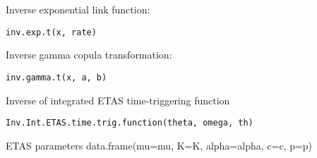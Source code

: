 \documentclass[letterpaper]{book}
\begin{document}
%
\begin{Description}\relax
Inverse exponential link function:
\end{Description}
%
\begin{Usage}
\begin{verbatim}
inv.exp.t(x, rate)
\end{verbatim}
\end{Usage}
%
\begin{Arguments}
\begin{ldescription}
\item[\code{rate}] 
\end{ldescription}
\end{Arguments}
%
\begin{Description}\relax
Inverse gamma copula transformation:
\end{Description}
%
\begin{Usage}
\begin{verbatim}
inv.gamma.t(x, a, b)
\end{verbatim}
\end{Usage}
%
\begin{Arguments}
\begin{ldescription}
\item[\code{b}] 
\end{ldescription}
\end{Arguments}
%
\begin{Description}\relax
Inverse of integrated ETAS time-triggering function
\end{Description}
%
\begin{Usage}
\begin{verbatim}
Inv.Int.ETAS.time.trig.function(theta, omega, th)
\end{verbatim}
\end{Usage}
%
\begin{Arguments}
\begin{ldescription}
\item[\code{theta}] ETAS parameters data.frame(mu=mu, K=K, alpha=alpha, c=c, p=p)

\item[\code{th}] 
\end{ldescription}
\end{Arguments}
\end{document}
